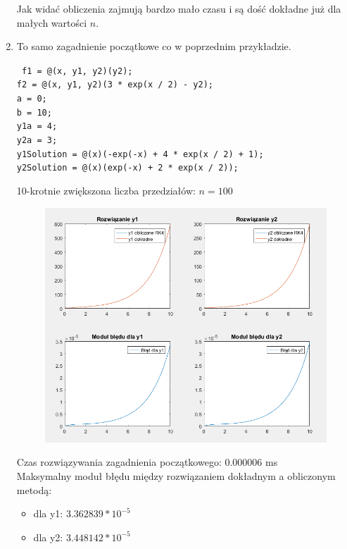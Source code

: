 \documentclass[12pt]{article}
\begin{document}
\begin{enumerate}[label=\textbf{Przykład \arabic*}]
		Jak widać obliczenia zajmują bardzo mało czasu i są dość dokładne już dla małych wartości $n$.
		
		\item 
		\label{example-changingN-2}
		To samo zagadnienie początkowe co w poprzednim przykładzie.
		
		\texttt{
			f1 = @(x, y1, y2)(y2);	\\
			f2 = @(x, y1, y2)(3 * exp(x / 2) - y2);\\
			a = 0;\\
			b = 10;\\
			y1a = 4;\\
			y2a = 3;\\	
			y1Solution = @(x)(-exp(-x) + 4 * exp(x / 2) + 1); \\
			y2Solution = @(x)(exp(-x) + 2 * exp(x / 2));
		}
		
		10-krotnie zwiększona liczba przedziałów: $n = 100$
		
		\begin{figure}[H]
			\centering
			\includegraphics[scale=0.7]{images/example-2.png}
		\end{figure}
		
		
		Czas rozwiązywania zagadnienia początkowego: 0.000006 ms\\
		Maksymalny moduł błędu między rozwiązaniem dokładnym a obliczonym metodą:
		\begin{itemize}
			\item dla y1: $3.362839 * 10^{-5}$
			\item dla y2: $3.448142 * 10^{-5}$
		\end{itemize}
	

\end{enumerate}
\end{document}
